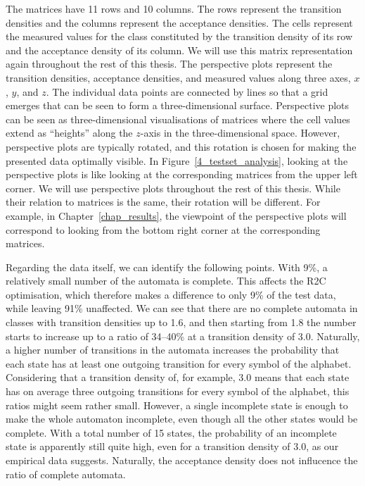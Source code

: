The matrices have 11 rows and 10 columns. The rows represent the transition densities and the columns represent the acceptance densities. The cells represent the measured values for the class constituted by the transition density of its row and the acceptance density of its column. We will use this matrix representation again throughout the rest of this thesis. The perspective plots represent the transition densities, acceptance densities, and measured values along three axes, $x$, $y$, and $z$. The individual data points are connected by lines so that a grid emerges that can be seen to form a three-dimensional surface. Perspective plots can be seen as three-dimensional visualisations of matrices where the cell values extend as ``heights'' along the $z$-axis in the three-dimensional space. However, perspective plots are typically rotated, and this rotation is chosen for making the presented data optimally visible. In Figure~\ref{4_testset_analysis}, looking at the perspective plots is like looking at the corresponding matrices from the upper left corner. We will use perspective plots throughout the rest of this thesis. While their relation to matrices is the same, their rotation will be different. For example, in Chapter~\ref{chap_results}, the viewpoint of the perspective plots will correspond to looking from the bottom right corner at the corresponding matrices.

Regarding the data itself, we can identify the following points. With 9\%, a relatively small number of the automata is complete. This affects the R2C optimisation, which therefore makes a difference to only 9\% of the test data, while leaving 91\% unaffected. We can see that there are no complete automata in classes with transition densities up to 1.6, and then starting from 1.8 the number starts to increase up to a ratio of 34--40\% at a transition density of 3.0. Naturally, a higher number of transitions in the automata increases the probability that each state has at least one outgoing transition for every symbol of the alphabet. Considering that a transition density of, for example, 3.0 means that each state has on average three outgoing transitions for every symbol of the alphabet, this ratios might seem rather small. However, a single incomplete state is enough to make the whole automaton incomplete, even though all the other states would be complete. With a total number of 15 states, the probability of an incomplete state is apparently still quite high, even for a transition density of 3.0, as our empirical data suggests. Naturally, the acceptance density does not influcence the ratio of complete automata.

